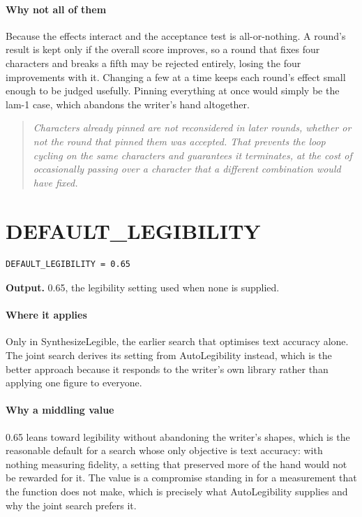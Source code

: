 \paragraph{Why not all of them}
Because the effects interact and the acceptance test is all-or-nothing. A round's result is kept only if the overall score improves, so a round that fixes four characters and breaks a fifth may be rejected entirely, losing the four improvements with it. Changing a few at a time keeps each round's effect small enough to be judged usefully. Pinning everything at once would simply be the lam-1 case, which abandons the writer's hand altogether.


\begin{quote}\small\itshape Characters already pinned are not reconsidered in later rounds, whether or not the round that pinned them was accepted. That prevents the loop cycling on the same characters and guarantees it terminates, at the cost of occasionally passing over a character that a different combination would have fixed.\end{quote}

\section{DEFAULT\_LEGIBILITY}
\begin{lstlisting}[style=sig]
DEFAULT_LEGIBILITY = 0.65
\end{lstlisting}

\noindent\textbf{Output.} 0.65, the legibility setting used when none is supplied.


\paragraph{Where it applies}
Only in SynthesizeLegible, the earlier search that optimises text accuracy alone. The joint search derives its setting from AutoLegibility instead, which is the better approach because it responds to the writer's own library rather than applying one figure to everyone.


\paragraph{Why a middling value}
0.65 leans toward legibility without abandoning the writer's shapes, which is the reasonable default for a search whose only objective is text accuracy: with nothing measuring fidelity, a setting that preserved more of the hand would not be rewarded for it. The value is a compromise standing in for a measurement that the function does not make, which is precisely what AutoLegibility supplies and why the joint search prefers it.


